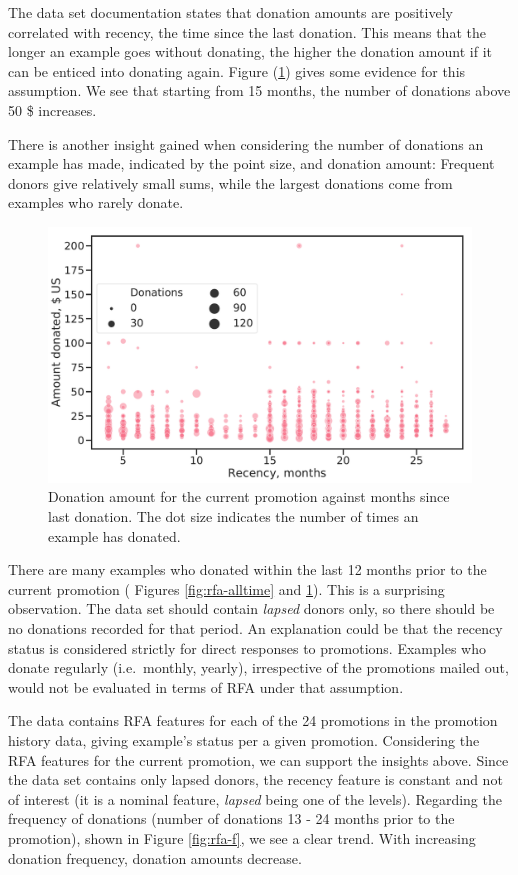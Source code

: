 \documentclass[
  11pt,
  a4paper,
  DIV=12,captions=tableheading,oneside,titlepage]{scrbook}
\begin{document}
The data set documentation states that donation amounts are positively correlated with recency, the time since the last donation. This means that the longer an example goes without donating, the higher the donation amount if it can be enticed into donating again. Figure (\ref{fig:donations-vs-time}) gives some evidence for this assumption. We see that starting from 15 months, the number of donations above 50 \$ increases.

There is another insight gained when considering the number of donations an example has made, indicated by the point size, and donation amount: Frequent donors give relatively small sums, while the largest donations come from examples who rarely donate.



\begin{figure}

{\centering \includegraphics[width=0.7\linewidth]{figures/eda/donations-vs-time-since-last-size-nbr-donations} 

}

\caption{Donation amount for the current promotion against months since last donation. The dot size indicates the number of times an example has donated.}\label{fig:donations-vs-time}
\end{figure}

There are many examples who donated within the last 12 months prior to the current promotion ( Figures \ref{fig:rfa-alltime} and \ref{fig:donations-vs-time}). This is a surprising observation. The data set should contain \emph{lapsed} donors only, so there should be no donations recorded for that period. An explanation could be that the recency status is considered strictly for direct responses to promotions. Examples who donate regularly (i.e.~monthly, yearly), irrespective of the promotions mailed out, would not be evaluated in terms of RFA under that assumption.

The data contains RFA features for each of the 24 promotions in the promotion history data, giving example's status per a given promotion. Considering the RFA features for the current promotion, we can support the insights above. Since the data set contains only lapsed donors, the recency feature is constant and not of interest (it is a nominal feature, \emph{lapsed} being one of the levels). Regarding the frequency of donations (number of donations 13 - 24 months prior to the promotion), shown in Figure \ref{fig:rfa-f}, we see a clear trend. With increasing donation frequency, donation amounts decrease.
\end{document}
